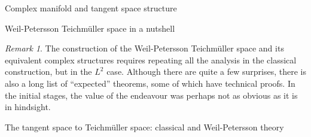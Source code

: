 \documentclass[12pt]{amsart}
\theoremstyle{plain}
\theoremstyle{definition}
\theoremstyle{remark}
\newtheorem{remark}[theorem]{Remark}
\numberwithin{equation}{section} %
\numberwithin{figure}{section} %
\begin{document}
\begin{section}{Complex manifold and tangent space structure}
\begin{subsection}{Weil-Petersson Teichm\"uller space in a nutshell}
 \begin{remark}
 The construction of the Weil-Petersson Teichm\"uller space and its equivalent complex structures requires repeating all the analysis in the classical construction, but in the $L^2$ case. Although there are quite a few surprises, there is also a long list of ``expected'' theorems, some of which have technical proofs. In the initial stages, the value of the endeavour was perhaps not as obvious as it is in hindsight.
 \end{remark}
\end{subsection}
\begin{subsection}{The tangent space to Teichm\"uller space: classical and Weil-Petersson theory}

\end{subsection}
\end{section} 
\end{document}
